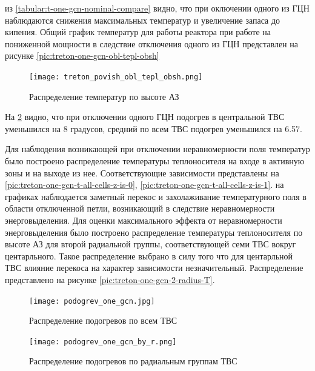 из \ref{tabular:t-one-gcn-nominal-compare} видно, что при оключении одного из ГЦН наблюдаются снижения максимальных температур и увеличение запаса до кипения. Общий график температур для работы реактора при работе на пониженной мощности в следствие отключения одного из ГЦН представлен на рисунке \ref{pic:treton-one-gcn-obl-tepl-obsh}

\begin{figure}[H]
	\begin{center}
		\texttt{[image: treton\_povish\_obl\_tepl\_obsh.png]}
		\caption{Распределение температур по высоте АЗ}
		\label{pic:treton-povish-obl-tepl-obsh} %
	\end{center}
\end{figure}

На \ref{pic:podogrev-one-gcn} видно, что при отключении одного ГЦН подогрев в центральной ТВС уменьшился на 8 градусов, средний по всем ТВС подогрев уменьшился на 6.57. 

Для наблюдения возникающей при отключении неравномерности поля температур было построено распределение температуры теплоносителя на входе в активную зоны и на выходе из нее. Соответствующие зависимости представлены на \ref{pic:treton-one-gcn-t-all-cells-z-is-0}, \ref{pic:treton-one-gcn-t-all-cells-z-is-1}. на графиках наблюдается заметный перекос и захолаживание температурного поля в области отключенной петли, возникающий в следствие неравномерности энерговыделения. Для оценки максимального эффекта от неравномерности энерговыделения было построено распределение температуры теплоносителя по высоте АЗ для второй радиальной группы, соответствующей семи ТВС вокруг центарльного. Такое распределение выбрано в силу того что для центарльной ТВС влияние перекоса на характер зависимости незначительный. Распределение представлено на рисунке \ref{pic:treton-one-gcn-2-radius-T}.

\begin{figure}[H]
	\begin{center}
		\texttt{[image: podogrev\_one\_gcn.jpg]}
		\caption{Распределение подогревов по всем ТВС}
		\label{pic:podogrev-one-gcn} %
	\end{center}
\end{figure}

\begin{figure}[H]
	\begin{center}
		\texttt{[image: podogrev\_one\_gcn\_by\_r.png]}
		\caption{Распределение подогревов по радиальным группам ТВС}
		\label{pic:podogrev-one-gcn-by-r} %
	\end{center}
\end{figure}

